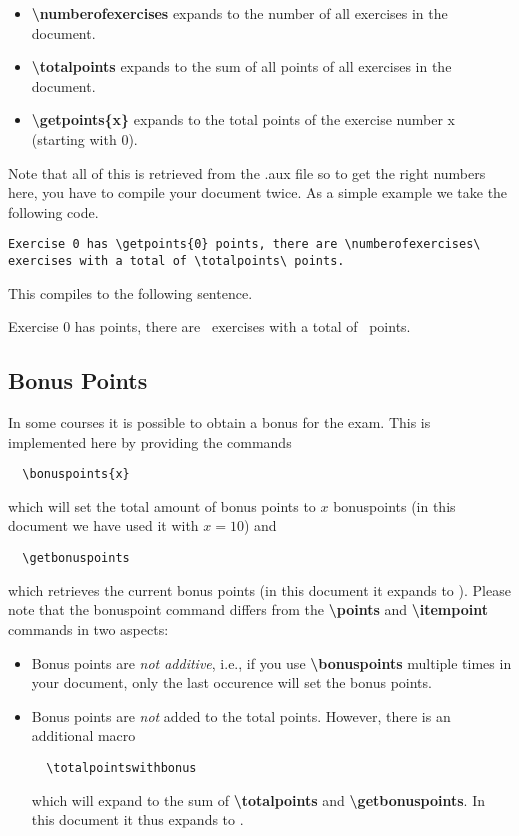\documentclass[
  twocolumn,%
  fontsize=9pt,%
  DIV=calc,%
  numbers=noendperiod%
]{scrartcl}
\begin{document}
\begin{itemize}
  \item \textcolor{NavyBlue}{\ttfamily\bfseries\textbackslash numberofexercises} expands to the number of all exercises in the document.
  \item \textcolor{NavyBlue}{\ttfamily\bfseries\textbackslash totalpoints} expands to the sum of all points of all exercises in the document. 
  \item \textcolor{NavyBlue}{\ttfamily\bfseries\textbackslash getpoints\{x\}} expands to the total points of the exercise number x (starting with $0$). 
\end{itemize}
Note that all of this is retrieved from the .aux file so to get the right numbers here, you have to compile your document twice. As a simple example we take the following code.


\begin{lstlisting}[emph={numberofexercises,totalpoints,getpoints}]
  Exercise 0 has \getpoints{0} points, there are \numberofexercises\ exercises with a total of \totalpoints\ points.
\end{lstlisting}

\noindent This compiles to the following sentence.\smallskip

Exercise 0 has  points, there are \numberofexercises\ exercises with a total of \totalpoints\ points.

\subsection{Bonus Points}
In some courses it is possible to obtain a bonus for the exam. This is implemented here by providing the commands
\begin{lstlisting}
  \bonuspoints{x}
\end{lstlisting}
which will set the total amount of bonus points to $x$ bonuspoints (in this document we have used it with $x=10$) and
\begin{lstlisting}
  \getbonuspoints
\end{lstlisting}
which retrieves the current bonus points (in this document it expands to \getbonuspoints). Please note that the {bonuspoint} command differs from the \textcolor{NavyBlue}{\ttfamily\bfseries\textbackslash points} and \textcolor{NavyBlue}{\ttfamily\bfseries\textbackslash itempoint} commands in two aspects:
\begin{itemize} 
\item Bonus points are \emph{not additive}, i.e., if you use \textcolor{NavyBlue}{\ttfamily\bfseries\textbackslash bonuspoints} multiple times in your document, only the last occurence will set the bonus points.
\item Bonus points are \emph{not} added to the total points. However, there is an additional macro 
\begin{lstlisting}
  \totalpointswithbonus
\end{lstlisting}
which will expand to the sum of \textcolor{NavyBlue}{\ttfamily\bfseries\textbackslash totalpoints} and \textcolor{NavyBlue}{\ttfamily\bfseries\textbackslash getbonuspoints}. In this document it thus expands to \totalpointswithbonus.
\end{itemize}
\end{document}
